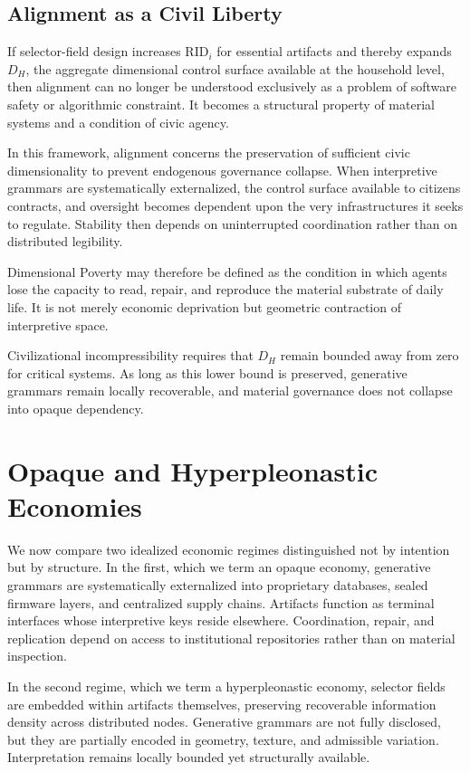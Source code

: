 \documentclass[11pt]{article}
\begin{document}
\subsection{Alignment as a Civil Liberty}

If selector-field design increases $\text{RID}_i$ for essential artifacts
and thereby expands $D_H$, the aggregate dimensional control surface
available at the household level, then alignment can no longer be
understood exclusively as a problem of software safety or algorithmic
constraint. It becomes a structural property of material systems and a
condition of civic agency.

In this framework, alignment concerns the preservation of sufficient
civic dimensionality to prevent endogenous governance collapse. When
interpretive grammars are systematically externalized, the control
surface available to citizens contracts, and oversight becomes dependent
upon the very infrastructures it seeks to regulate. Stability then
depends on uninterrupted coordination rather than on distributed
legibility.

Dimensional Poverty may therefore be defined as the condition in which
agents lose the capacity to read, repair, and reproduce the material
substrate of daily life. It is not merely economic deprivation but
geometric contraction of interpretive space.

Civilizational incompressibility requires that $D_H$ remain bounded away
from zero for critical systems. As long as this lower bound is preserved,
generative grammars remain locally recoverable, and material governance
does not collapse into opaque dependency.

\section{Opaque and Hyperpleonastic Economies}

We now compare two idealized economic regimes distinguished not by
intention but by structure. In the first, which we term an opaque
economy, generative grammars are systematically externalized into
proprietary databases, sealed firmware layers, and centralized supply
chains. Artifacts function as terminal interfaces whose interpretive
keys reside elsewhere. Coordination, repair, and replication depend on
access to institutional repositories rather than on material inspection.

In the second regime, which we term a hyperpleonastic economy, selector
fields are embedded within artifacts themselves, preserving recoverable
information density across distributed nodes. Generative grammars are
not fully disclosed, but they are partially encoded in geometry, texture,
and admissible variation. Interpretation remains locally bounded yet
structurally available.
\end{document}
